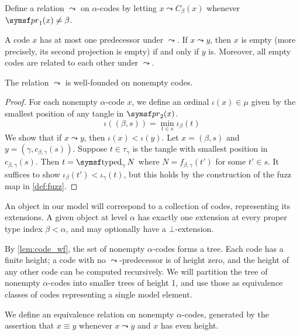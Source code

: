\begin{definition}
    Define a relation \( \rightcurvedarrow \) on \( \alpha \)-codes by letting \( x \rightcurvedarrow C_\beta(x) \) whenever \( \pr_1(x) \neq \beta \).
\end{definition}
\begin{remark}
    A code \( x \) has at most one predecessor under \( \rightcurvedarrow \).
    If \( x \rightcurvedarrow y \), then \( x \) is empty (more precisely, its second projection is empty) if and only if \( y \) is.
    Moreover, all empty codes are related to each other under \( \rightcurvedarrow \).
\end{remark}

\begin{lemma}
    \label{lem:code_wf}
    The relation \( \rightcurvedarrow \) is well-founded on nonempty codes.
\end{lemma}
\begin{proof}
    For each nonempty \( \alpha \)-code \( x \), we define an ordinal \( \iota(x) \in \mu \) given by the smallest position of any tangle in \( \pr_2(x) \).
    \[ \iota((\beta, s)) = \min_{t \in s} \iota_\beta(t) \]
    We show that if \( x \rightcurvedarrow y \), then \( \iota(x) < \iota(y) \).
    Let \( x = (\beta, s) \) and \( y = (\gamma, c_{\beta,\gamma}(s)) \).
    Suppose \( t \in \tau_\gamma \) is the tangle with smallest position in \( c_{\beta,\gamma}(s) \).
    Then \( t = \typed_\gamma N \) where \( N = f_{\beta,\gamma}(t') \) for some \( t' \in s \).
    It suffices to show \( \iota_\beta(t') < \iota_\gamma(t) \), but this holds by the construction of the fuzz map in \cref{def:fuzz}.
\end{proof}

An object in our model will correspond to a collection of codes, representing its extensions.
A given object at level \( \alpha \) has exactly one extension at every proper type index \( \beta < \alpha \), and may optionally have a \( \bot \)-extension.

By \cref{lem:code_wf}, the set of nonempty \( \alpha \)-codes forms a tree.
Each code has a finite height; a code with no \( \rightcurvedarrow \)-predecessor is of height zero, and the height of any other code can be computed recursively.
We will partition the tree of nonempty \( \alpha \)-codes into smaller trees of height 1, and use those as equivalence classes of codes representing a single model element.

\begin{definition}
    We define an equivalence relation on nonempty \( \alpha \)-codes, generated by the assertion that \( x \equiv y \) whenever \( x \rightcurvedarrow y \) and \( x \) has even height.
\end{definition}

